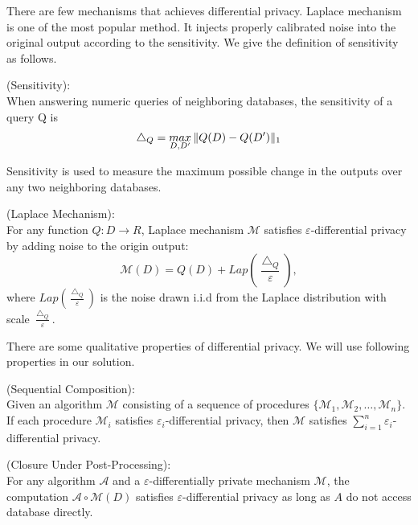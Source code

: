 \documentclass[conference]{IEEEtran}
\begin{document}
There are few mechanisms that achieves differential privacy.
Laplace mechanism is one of the most popular method. 
It injects properly calibrated noise into the original output according to the sensitivity.
We give the definition of sensitivity as follows.

\begin{definition}{(Sensitivity):}\\
When answering numeric queries of neighboring databases, the sensitivity of a query Q is 
\begin{equation}
\bigtriangleup_Q=\mathop{max}\limits_{D,D'}\Arrowvert Q(D)-Q(D') \Arrowvert_1
\end{equation}
\end{definition}
Sensitivity is used to measure the maximum possible change in the outputs over any two neighboring databases.

\begin{definition}{(Laplace Mechanism):}\\
For any function $Q:D\rightarrow R$, Laplace mechanism $\mathcal{M}$ satisfies $\varepsilon$-differential privacy by adding noise to the origin output:
\begin{equation}
    \mathcal{M}(D) = Q(D)+Lap(\frac{\bigtriangleup_Q}{\varepsilon}),
\end{equation}
where $Lap(\frac{\bigtriangleup_Q}{\varepsilon})$ is the noise drawn i.i.d from the Laplace distribution with scale $\frac{\bigtriangleup_Q}{\varepsilon}$.
\end{definition}
There are some qualitative properties of differential privacy. We will use following properties in our solution. 

\begin{lemma}{(Sequential Composition):}\\\label{lm1}
Given an algorithm $\mathcal{M}$ consisting of a sequence of procedures $\{\mathcal{M}_1,\mathcal{M}_2,\dots,\mathcal{M}_n\}$. 
If each procedure $\mathcal{M}_i$ satisfies $\varepsilon_i$-differential privacy, then $\mathcal{M}$ satisfies $\sum_{i=1}^n\varepsilon_i$-differential privacy.
\end{lemma}

\begin{lemma}{(Closure Under Post-Processing):}\\\label{lm2}
    For any algorithm $\mathcal{A}$ and a $\varepsilon$-differentially private mechanism $\mathcal{M}$,
    the computation $\mathcal{A}\circ\mathcal{M}(D)$ satisfies $\varepsilon$-differential privacy as long as $A$ do not access database directly.
    
\end{lemma}
\end{document}
